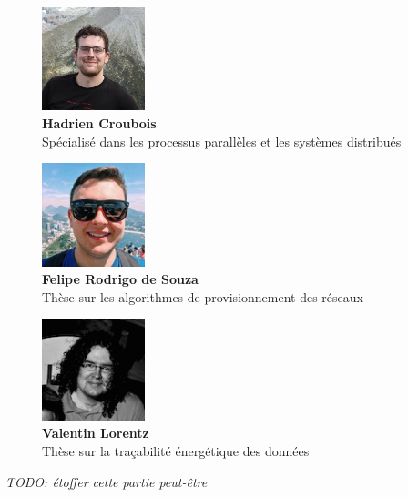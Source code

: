 \begin{figure}[h!]
	\begin{minipage}{0.33\textwidth}
		\centering
		\includegraphics[height=3cm]{partie1/images/hadrien.jpeg}\\
		\textbf{Hadrien Croubois}\\
		Spécialisé dans les processus parallèles et les systèmes distribués
	\end{minipage}\hfill
	\begin{minipage}{0.33\textwidth}
		\centering
		\includegraphics[width=3cm]{partie1/images/felipe.jpg}\\
		\textbf{Felipe Rodrigo de Souza}\\
		Thèse sur les algorithmes de provisionnement des réseaux
	\end{minipage}\hfill
	\begin{minipage}{0.33\textwidth}
		\centering
		\includegraphics[width=3cm]{partie1/images/valentin.jpg}\\
		\textbf{Valentin Lorentz}\\
		Thèse sur la traçabilité énergétique des données
	\end{minipage}
\end{figure}

\emph{TODO: étoffer cette partie peut-être}